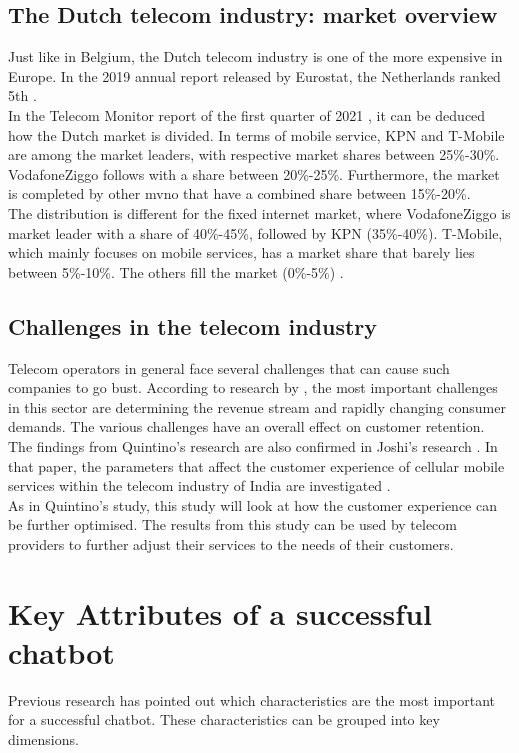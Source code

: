 \subsection{The Dutch telecom industry: market overview}
Just like in Belgium, the Dutch telecom industry is one of the more expensive in Europe. In the 2019 annual report released by Eurostat, the Netherlands ranked 5th \citep{Eurostat2020}.\\
In the Telecom Monitor report of the first quarter of 2021 \citep{Acm2021}, it can be deduced how the Dutch market is divided. In terms of mobile service, KPN and T-Mobile are among the market leaders, with respective market shares between 25\%-30\%. VodafoneZiggo follows with a share between 20\%-25\%. Furthermore, the market is completed by other \acrfull{mvno} that have a combined share between 15\%-20\%. \citep{Acm2021}\\
The distribution is different for the fixed internet market, where VodafoneZiggo is market leader with a share of 40\%-45\%, followed by KPN (35\%-40\%). T-Mobile, which mainly focuses on mobile services, has a market share that barely lies between 5\%-10\%. The others fill the market (0\%-5\%) \citep{Acm2021}.

\subsection{Challenges in the telecom industry}
Telecom operators in general face several challenges that can cause such companies to go bust. According to research by \citeauthor{Quintino2019}, the most important challenges in this sector are determining the revenue stream and rapidly changing consumer demands. The various challenges have an overall effect on customer retention. The findings from Quintino's research are also confirmed in Joshi's research \citep{Joshi2014}. In that paper, the parameters that affect the customer experience of cellular mobile services within the telecom industry of India are investigated \citep{Joshi2014, Malviya2012, Quintino2019}.\\
As in Quintino's study, this study will look at how the customer experience can be further optimised. The results from this study can be used by telecom providers to further adjust their services to the needs of their customers.

\section{Key Attributes of a successful chatbot}
Previous research \citep{Muizzah2021, Verkeyn2018} has pointed out which characteristics are the most important for a successful chatbot. These characteristics can be grouped into key dimensions.

